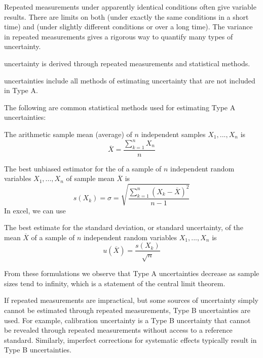 \documentclass[12pt, a4paper, oneside, openright, titlepage]{book}
\begin{document}
\begin{appendices}
    Repeated measurements under apparently identical conditions often give variable results. There are limits on both  (under exactly the same conditions in a short time) and  (under slightly different conditions or over a long time). The variance in repeated measurements gives a rigorous way to quantify many types of uncertainty.

    \begin{defn}
         uncertainty is derived through repeated measurements and statistical methods.

         uncertainties include all methods of estimating uncertainty that are not included in Type A.
    \end{defn}


    The following are common statistical methods used for estimating Type A uncertainties:

    \begin{defn}
        The arithmetic sample mean (average) of $n$ independent samples $X_1,...,X_n$ is $$\overline{X} =  \frac{\sum_{k=1}^nX_n}{n}$$
    \end{defn}

    \begin{defn}
        The best unbiased estimator for the  of a sample of $n$ independent random variables $X_1,...,X_n$ of sample mean $\overline{X}$ is $$s(X_k) = \sigma = \sqrt{\frac{\sum_{k=1}^n(X_k-\overline{X})^2}{n-1}}$$
        In excel, we can use 
    \end{defn}

    \begin{defn}
        The best estimate for the standard deviation, or standard uncertainty, of the mean $\overline{X}$ of a sample of $n$ independent random variables $X_1,...,X_n$ is $$u(\overline{X}) = \frac{s(X_k)}{\sqrt{n}}$$
    \end{defn}

    From these formulations we observe that Type A uncertainties decrease as sample sizes tend to infinity, which is a statement of the central limit theorem.

    If repeated measurements are impractical, but some sources of uncertainty simply cannot be estimated through repeated measurements, Type B uncertainties are used. For example, calibration uncertainty is a Type B uncertainty that cannot be revealed through repeated measurements without access to a reference standard. Similarly, imperfect corrections for systematic effects typically result in Type B uncertainties.


\end{appendices}
\end{document}
